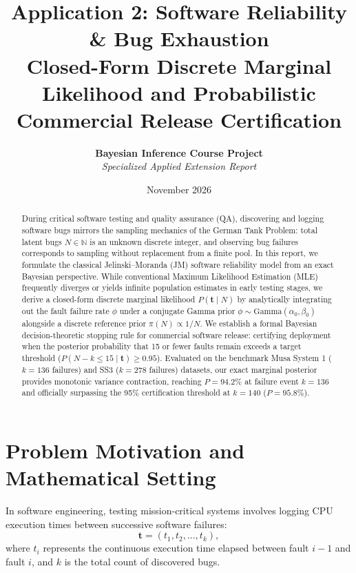 \documentclass[11pt,a4paper]{article}
\title{\textbf{\Large Application 2: Software Reliability \& Bug Exhaustion}\\
\large Closed-Form Discrete Marginal Likelihood and Probabilistic Commercial Release Certification}
\author{\textbf{Bayesian Inference Course Project} \\
\textit{Specialized Applied Extension Report}}
\date{November 2026}
\begin{document}
\maketitle

\begin{abstract}
During critical software testing and quality assurance (QA), discovering and logging software bugs mirrors the sampling mechanics of the German Tank Problem: total latent bugs $N \in \mathbb{N}$ is an unknown discrete integer, and observing bug failures corresponds to sampling without replacement from a finite pool. In this report, we formulate the classical Jelinski--Moranda (JM) software reliability model from an exact Bayesian perspective. While conventional Maximum Likelihood Estimation (MLE) frequently diverges or yields infinite population estimates in early testing stages, we derive a closed-form discrete marginal likelihood $P(\mathbf{t} \mid N)$ by analytically integrating out the fault failure rate $\phi$ under a conjugate Gamma prior $\phi \sim \text{Gamma}(\alpha_0, \beta_0)$ alongside a discrete reference prior $\pi(N) \propto 1/N$. We establish a formal Bayesian decision-theoretic stopping rule for commercial software release: certifying deployment when the posterior probability that 15 or fewer faults remain exceeds a target threshold ($P(N - k \le 15 \mid \mathbf{t}) \ge 0.95$). Evaluated on the benchmark Musa System 1 ($k = 136$ failures) and SS3 ($k = 278$ failures) datasets, our exact marginal posterior provides monotonic variance contraction, reaching $P = 94.2\%$ at failure event $k = 136$ and officially surpassing the 95\% certification threshold at $k = 140$ ($P = 95.8\%$).
\end{abstract}

\section{Problem Motivation and Mathematical Setting}

In software engineering, testing mission-critical systems involves logging CPU execution times between successive software failures:
\begin{equation}
\mathbf{t} = (t_1, t_2, \dots, t_k),
\end{equation}
where $t_i$ represents the continuous execution time elapsed between fault $i-1$ and fault $i$, and $k$ is the total count of discovered bugs.
\end{document}
